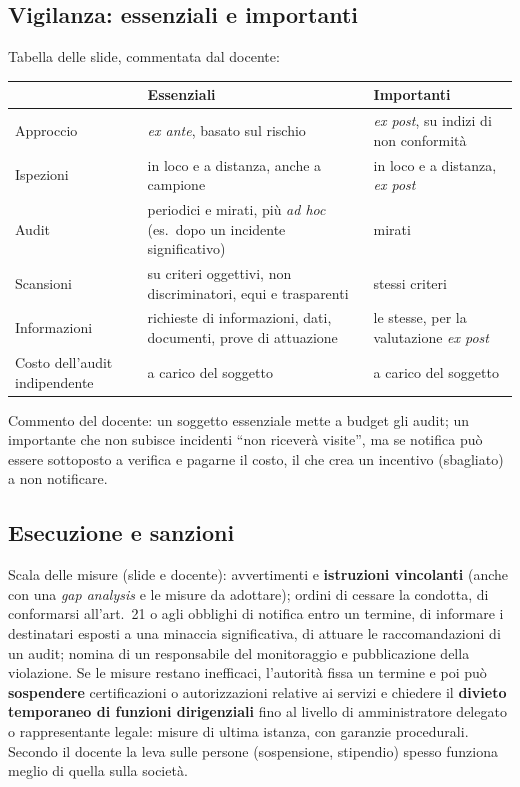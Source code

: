 \subsection{Vigilanza: essenziali e importanti}
Tabella delle slide, commentata dal docente:
\begin{center}
\small
\begin{tabularx}{\linewidth}{>{\raggedright\arraybackslash}p{2.8cm} X X}
\toprule
 & \textbf{Essenziali} & \textbf{Importanti}\\
\midrule
Approccio & \emph{ex ante}, basato sul rischio & \emph{ex post}, su indizi di non conformità\\
Ispezioni & in loco e a distanza, anche a campione & in loco e a distanza, \emph{ex post}\\
Audit & periodici e mirati, più \emph{ad hoc} (es.\ dopo un incidente significativo) & mirati\\
Scansioni & su criteri oggettivi, non discriminatori, equi e trasparenti & stessi criteri\\
Informazioni & richieste di informazioni, dati, documenti, prove di attuazione & le stesse, per la
  valutazione \emph{ex post}\\
Costo dell'audit indipendente & a carico del soggetto & a carico del soggetto\\
\bottomrule
\end{tabularx}
\end{center}
Commento del docente: un soggetto essenziale mette a budget gli audit; un importante che non subisce
incidenti ``non riceverà visite'', ma se notifica può essere sottoposto a verifica e pagarne il costo,
il che crea un incentivo (sbagliato) a non notificare.

\subsection{Esecuzione e sanzioni}
Scala delle misure (slide e docente): avvertimenti e \textbf{istruzioni vincolanti} (anche con una
\emph{gap analysis} e le misure da adottare); ordini di cessare la condotta, di conformarsi
all'art.~21 o agli obblighi di notifica entro un termine, di informare i destinatari esposti a una
minaccia significativa, di attuare le raccomandazioni di un audit; nomina di un responsabile del
monitoraggio e pubblicazione della violazione. Se le misure restano inefficaci, l'autorità fissa un
termine e poi può \textbf{sospendere} certificazioni o autorizzazioni relative ai servizi e chiedere il
\textbf{divieto temporaneo di funzioni dirigenziali} fino al livello di amministratore delegato o
rappresentante legale: misure di ultima istanza, con garanzie procedurali. Secondo il docente la leva
sulle persone (sospensione, stipendio) spesso funziona meglio di quella sulla società.


